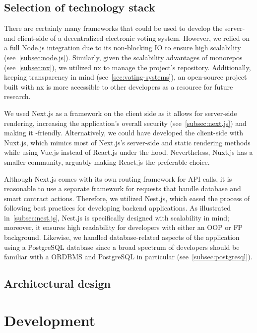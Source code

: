 \subsection{Selection of technology stack}\label{subsec:selection-of-tech-stack}

There are certainly many frameworks that could be used to develop the server- and client-side of a decentralized electronic voting system.
However, we relied on a full Node.js integration due to its non-blocking \gls{IO} to ensure high scalability (see~\cref{subsec:node.js}).
Similarly, given the scalability advantages of monorepos (see~\cref{subsec:nx}), we utilized nx to manage the project's repository.
Additionally, keeping transparency in mind (see~\cref{sec:voting-systems}), an open-source project built with nx is more accessible to other developers as a resource for future research.

We used Next.js as a framework on the client side as it allows for server-side rendering, increasing the application's overall security (see~\cref{subsec:next.js}) and making it -friendly.
Alternatively, we could have developed the client-side with Nuxt.js, which mimics most of Next.js's server-side and static rendering methods while using Vue.js instead of React.js under the hood.
Nevertheless, Nuxt.js has a smaller community, arguably making React.js the preferable choice.

Although Next.js comes with its own routing framework for API calls, it is reasonable to use a separate framework for requests that handle database and smart contract actions.
Therefore, we utilized Nest.js, which eased the process of following best practices for developing backend applications.
As illustrated in~\cref{subsec:nest.js}, Nest.js is specifically designed with scalability in mind;
moreover, it ensures high readability for developers with either an \gls{OOP} or \gls{FP} background.
Likewise, we handled database-related aspects of the application using a PostgreSQL database since a broad spectrum of developers should be familiar with a \gls{ORDBMS} and PostgreSQL in particular (see~\cref{subsec:postgresql}).

\subsection{Architectural design}\label{subsec:architectural-design}


\section{Development}\label{sec:development}

